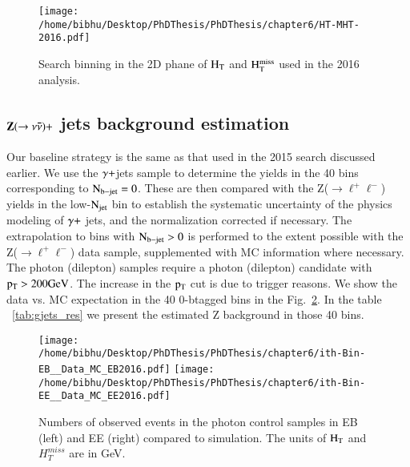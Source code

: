 \begin{figure}[h]
\begin{center}
\texttt{[image: /home/bibhu/Desktop/PhDThesis/PhDThesis/chapter6/HT-MHT-2016.pdf]}

\caption{\label{fig:HT-MHT-2016} Search binning in the 2D phane of $\rm H_{T}$ and $\rm H_{T}^{miss}$ used in the 2016 analysis.}
\end{center}
\end{figure}



\subsection{\bf $\bf Z(\rightarrow \nu \bar{\nu})+$ jets background estimation}


Our baseline strategy is the same as that used in the 2015 search discussed earlier.
We use the $\rm \gamma +$jets sample to determine the
yields in the 40 bins corresponding to $\rm N_{b-jet}=0$.  These are
 then compared with the Z($\rightarrow \ell^{+} \ell^{-}$) yields in the low-$\rm N_{jet}$
bin to establish the systematic uncertainty of the physics modeling of
$\rm \gamma +$ jets, and the normalization corrected if necessary.  
The extrapolation to bins with $\rm N_{b-jet}>0$ is performed to
the extent possible with the Z($\rightarrow \ell^{+} \ell^{-}$) data sample, supplemented with MC
information where necessary.  The photon (dilepton) samples require a
photon (dilepton) candidate with $\rm p_{T}>200 GeV$. The increase in the $\rm p_{T}$ cut is due to trigger reasons. We show the data vs. MC expectation in the 40  0-btagged bins in the Fig.~\ref{fig:nobs2016}. In the table ~\ref{tab:gjets_res} we present the estimated Z background in those 40 bins.


\begin{figure}[h]
\begin{center}
\texttt{[image: /home/bibhu/Desktop/PhDThesis/PhDThesis/chapter6/ith-Bin-EB\_\_Data\_MC\_EB2016.pdf]} %
\texttt{[image: /home/bibhu/Desktop/PhDThesis/PhDThesis/chapter6/ith-Bin-EE\_\_Data\_MC\_EE2016.pdf]} %
\caption{Numbers of observed events in the photon control samples in EB (left) and EE (right) compared to simulation. The units of $\rm H_{T}$ and $H_{T}^{miss}$ are in GeV.}
\label{fig:nobs2016}
\end{center}
\end{figure}




